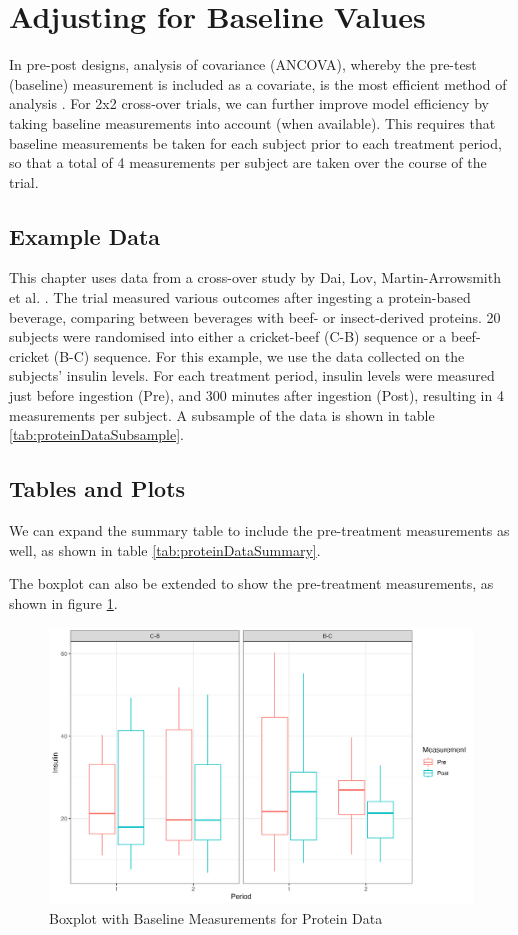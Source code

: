 \documentclass[12pt, TexShade, letterpaper]{report}
\begin{document}
\section{Adjusting for Baseline Values}
In pre-post designs, analysis of covariance (ANCOVA), whereby the pre-test (baseline) measurement is included as a covariate, is the most efficient method of analysis \cite{wan2021statistical}. For 2x2 cross-over trials, we can further improve model efficiency by taking baseline measurements into account (when available). This requires that baseline measurements be taken for each subject prior to each treatment period, so that a total of 4 measurements per subject are taken over the course of the trial.

\subsection{Example Data}
This chapter uses data from a cross-over study by Dai, Lov, Martin-Arrowsmith et al. \cite{dai2022insect}. The trial measured various outcomes after ingesting a protein-based beverage, comparing between beverages with beef- or insect-derived proteins. 20 subjects were randomised into either a cricket-beef (C-B) sequence or a beef-cricket (B-C) sequence. For this example, we use the data collected on the subjects' insulin levels. For each treatment period, insulin levels were measured just before ingestion (Pre), and 300 minutes after ingestion (Post), resulting in 4 measurements per subject. A subsample of the data is shown in table \ref{tab:proteinDataSubsample}.



\subsection{Tables and Plots}
We can expand the summary table to include the pre-treatment measurements as well, as shown in table \ref{tab:proteinDataSummary}.



The boxplot can also be extended to show the pre-treatment measurements, as shown in figure \ref{fig:proteinBoxplot}.

\begin{figure}
    \centering
    \includegraphics[width=0.85\linewidth]{report/figures/ch3/proteinBoxplot.png}
    \caption{Boxplot with Baseline Measurements for Protein Data}
    \label{fig:proteinBoxplot}
\end{figure}
\end{document}
